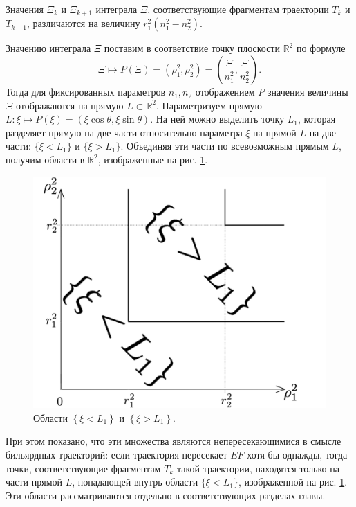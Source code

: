 \begin{statement}
Значения $\Xi_k$ и $\Xi_{k+1}$  интеграла $\Xi$, соответствующие фрагментам траектории $T_k$ и $T_{k+1}$, различаются на величину $r_1^2(n_1^2-n_2^2)$.
\end{statement}
Значению интеграла $\Xi$ поставим в соответствие точку плоскости $\mathbb{R}^2$ по формуле 
\begin{equation}
\Xi \mapsto P(\Xi) = (\rho_1^2, \rho_2^2) = \left( \frac{\Xi}{n_1^2}, \frac{\Xi}{n_2^2} \right).
\label{eq:XiMap}
\end{equation}
Тогда для фиксированных параметров $n_1, n_2$ отображением $P$ значения величины $\Xi$ отображаются на прямую $L \subset \mathbb{R}^2$. 
Параметризуем прямую $L: \xi \mapsto P(\xi) = (\xi \cos \theta, \xi \sin \theta)$. На ней можно выделить точку $L_1$, которая разделяет прямую на две части относительно параметра $\xi$ на прямой $L$ на две части: $\{ \xi < L_1\}$ и $\{ \xi > L_1\}$. Объединяя эти части по всевозможным прямым $L$, получим области в $\mathbb{R}^2$, изображенные на рис. \ref{fig:pt10:_lineDomains_simple}.
\begin{figure}[!htb]
\centering
\includegraphics[scale=0.07]{images/ch4/section3_circular/line_domains_simple.pdf}
    \caption{Области $\left\{\xi< L_1\right\}$ и $\left\{\xi > L_1\right\}$.}
    \label{fig:pt10:_lineDomains_simple}
\end{figure}
При этом показано, что эти множества являются непересекающимися в смысле бильярдных траекторий: если траектория пересекает $EF$ хотя бы однажды, тогда точки, соответствующие фрагментам $T_k$ такой траектории, находятся только на части прямой $L$, попадающей внутрь области $\{ \xi < L_1\}$, изображенной на рис. \ref{fig:pt10:_lineDomains_simple}.
Эти области рассматриваются отдельно в соответствующих разделах главы.


